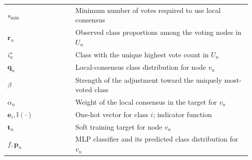 \begin{table}[!t]
\begin{tabular}{@{}p{0.27\linewidth}p{0.70\linewidth}@{}}
\(s_{\min}\) & Minimum number of votes required to use local consensus \\
\(\mathbf r_n\) & Observed class proportions among the voting nodes in \(U_n\) \\
\(i_n^\star\) & Class with the unique highest vote count in \(U_n\) \\
\(\mathbf q_n\) & Local-consensus class distribution for node \(v_n\) \\
\(\beta\) & Strength of the adjustment toward the uniquely most-voted class \\
\(\alpha_n\) & Weight of the local consensus in the target for \(v_n\) \\
\(\mathbf e_i,\mathbb I(\cdot)\) & One-hot vector for class \(i\); indicator function \\
\(\mathbf t_n\) & Soft training target for node \(v_n\) \\
\(f,\mathbf p_n\) & MLP classifier and its predicted class distribution for \(v_n\) \\
\bottomrule
\end{tabular}
\end{table}
